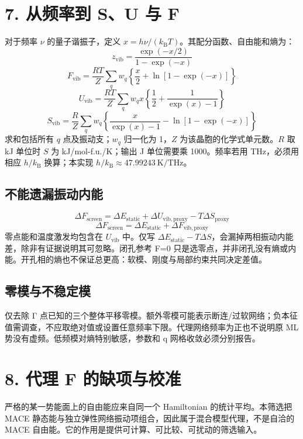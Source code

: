 \documentclass[UTF8,a4paper,11pt]{ctexart}
\begin{document}
\section*{7. 从频率到 S、U 与 F}
对于频率 \(\nu\) 的量子谐振子，定义 \(x=h\nu/(k_\mathrm{B}T)\)。其配分函数、自由能和熵为：
\begin{equation*}
z_{\mathrm{vib}}=\frac{\exp(-x/2)}{1-\exp(-x)}
\end{equation*}
\begin{equation*}
F_{\mathrm{vib}}=\frac{RT}{Z}\sum_q w_q\left\{\frac{x}{2}+\ln\left[1-\exp(-x)\right]\right\}
\end{equation*}
\begin{equation*}
U_{\mathrm{vib}}=\frac{RT}{Z}\sum_q w_qx\left\{\frac{1}{2}+\frac{1}{\exp(x)-1}\right\}
\end{equation*}
\begin{equation*}
S_{\mathrm{vib}}=\frac{R}{Z}\sum_q w_q\left\{\frac{x}{\exp(x)-1}-\ln\left[1-\exp(-x)\right]\right\}
\end{equation*}
求和包括所有 \(q\) 点及振动支；\(w_q\) 归一化为 1，\(Z\) 为该晶胞的化学式单元数。\(R\) 取 kJ 单位时 \(S\) 为 kJ/mol-f.u./K；输出 J 单位需要乘 1000。频率若用 THz，必须用相应 \(h/k_\mathrm{B}\) 换算；本实现 \(h/k_\mathrm{B}\approx47.99243\ \mathrm{K/THz}\)。
\subsection*{不能遗漏振动内能}
\begin{equation*}
\Delta F_{\mathrm{screen}}=\Delta E_{\mathrm{static}}+\Delta U_{\mathrm{vib,proxy}}-T\Delta S_{\mathrm{proxy}}
\end{equation*}
\begin{equation*}
\Delta F_{\mathrm{screen}}=\Delta E_{\mathrm{static}}+\Delta F_{\mathrm{vib,proxy}}
\end{equation*}
零点能和温度激发均包含在 \(U_\mathrm{vib}\) 中。仅写 \(\Delta E_\mathrm{static}-T\Delta S\)，会漏掉两相振动内能差，除非有证据说明其可忽略。闭孔参考 F=0 只是选零点，并非闭孔没有熵或内能。开孔相的熵也不保证总更高：软模、刚度与局部约束共同决定差值。
\subsection*{零模与不稳定模}
仅去除 Γ 点已知的三个整体平移零模。额外零模可能表示断连/过软网络；负本征值需调查，不应取绝对值或设置任意频率下限。代理网络频率为正也不说明原 ML 势没有虚频。低频模对熵特别敏感，参数和 q 网格收敛必须分别报告。
\clearpage
\section*{8. 代理 F 的缺项与校准}
严格的某一势能面上的自由能应来自同一个 Hamiltonian 的统计平均。本筛选把 MACE 静态能与独立弹性网络振动项组合，因此属于混合模型代理，不是自洽的 MACE 自由能。它的作用是提供可计算、可比较、可扰动的筛选输入。
\end{document}
